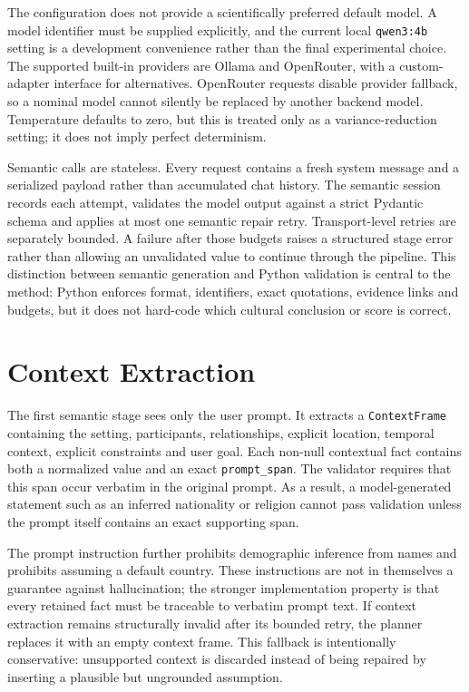 The configuration does not provide a scientifically preferred default model. A model identifier must be supplied explicitly, and the current local \texttt{qwen3:4b} setting is a development convenience rather than the final experimental choice. The supported built-in providers are Ollama and OpenRouter, with a custom-adapter interface for alternatives. OpenRouter requests disable provider fallback, so a nominal model cannot silently be replaced by another backend model. Temperature defaults to zero, but this is treated only as a variance-reduction setting; it does not imply perfect determinism.

Semantic calls are stateless. Every request contains a fresh system message and a serialized payload rather than accumulated chat history. The semantic session records each attempt, validates the model output against a strict Pydantic schema and applies at most one semantic repair retry. Transport-level retries are separately bounded. A failure after those budgets raises a structured stage error rather than allowing an unvalidated value to continue through the pipeline. This distinction between semantic generation and Python validation is central to the method: Python enforces format, identifiers, exact quotations, evidence links and budgets, but it does not hard-code which cultural conclusion or score is correct.

\section{Context Extraction}
\label{sec:context-extraction}

The first semantic stage sees only the user prompt. It extracts a \texttt{ContextFrame} containing the setting, participants, relationships, explicit location, temporal context, explicit constraints and user goal. Each non-null contextual fact contains both a normalized value and an exact \texttt{prompt\_span}. The validator requires that this span occur verbatim in the original prompt. As a result, a model-generated statement such as an inferred nationality or religion cannot pass validation unless the prompt itself contains an exact supporting span.

The prompt instruction further prohibits demographic inference from names and prohibits assuming a default country. These instructions are not in themselves a guarantee against hallucination; the stronger implementation property is that every retained fact must be traceable to verbatim prompt text. If context extraction remains structurally invalid after its bounded retry, the planner replaces it with an empty context frame. This fallback is intentionally conservative: unsupported context is discarded instead of being repaired by inserting a plausible but ungrounded assumption.

